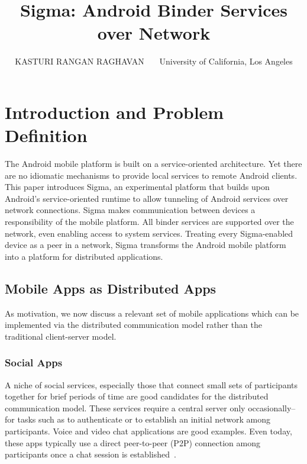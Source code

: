 \documentclass[prodmode]{acmlarge}
\title{Sigma: Android Binder Services over Network}
\author{KASTURI RANGAN RAGHAVAN~~~
University of California, Los Angeles
}
\begin{document}
\pagestyle{plain}
\maketitle
\tableofcontents

\clearpage
\section{Introduction and Problem Definition}

The Android mobile platform is built on a service-oriented architecture. Yet there are no idiomatic mechanisms to provide local services to remote Android clients. This paper introduces Sigma, an experimental platform that builds upon Android's service-oriented runtime to allow tunneling of Android services over network connections. Sigma makes communication between devices a responsibility of the mobile platform. All binder services are supported over the network, even enabling access to system services. Treating every Sigma-enabled device as a peer in a network, Sigma transforms the Android mobile platform into a platform for distributed applications.

\subsection{Mobile Apps as Distributed Apps}
As motivation, we now discuss a relevant set of mobile applications which can be implemented via the distributed communication model rather than the traditional client-server model.

\subsubsection{Social Apps}
A niche of social services, especially those that connect small sets of participants together for brief periods of time are good candidates for the distributed communication model. These services require a central server only occasionally--for tasks such as to authenticate or to establish an initial network among participants. Voice and video chat applications are good examples. Even today, these apps typically use a direct peer-to-peer (P2P) connection among participants once a chat session is established~\cite{SkypeStudy,GoogleTalkLibrary}.
\end{document}
